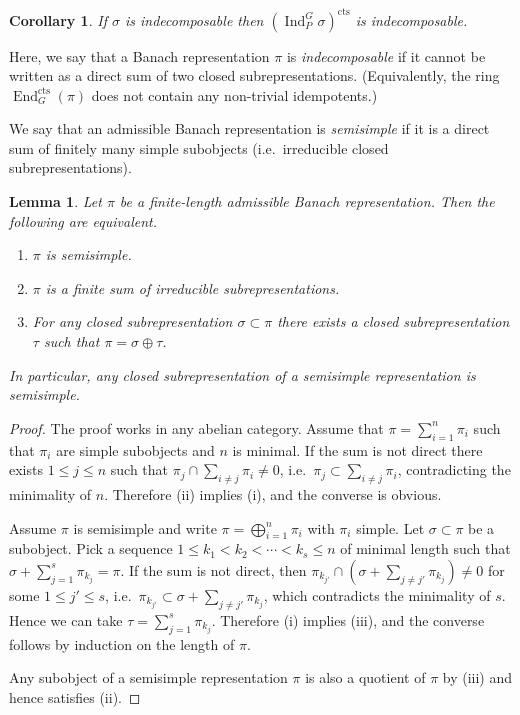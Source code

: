 \documentclass[a4paper]{amsart}
\numberwithin{equation}{section}
\newtheorem{lem}[thm]{Lemma}
\newtheorem{cor}[thm]{Corollary}
\theoremstyle{remark}
\theoremstyle{definition}
\DeclareMathOperator{\Ind}{Ind}
\DeclareMathOperator{\End}{End}
\newcommand{\cts}{\mathrm{cts}}
\begin{document}
\begin{cor}\label{cor:indecomposable}
If $\sigma$ is indecomposable then $(\Ind_{P}^{G}\sigma)^{\cts}$ is indecomposable.
\end{cor}

Here, we say that a Banach representation $\pi$ is \emph{indecomposable} if it cannot be written as a direct sum of two closed subrepresentations.
(Equivalently, the ring $\End_G^\cts(\pi)$ does not contain any non-trivial idempotents.)

We say that an admissible Banach representation is \emph{semisimple} if it is a direct sum of finitely many simple subobjects (i.e.\ irreducible closed subrepresentations).


\begin{lem}\label{lem:semisimple-banach}
Let $\pi$ be a finite-length admissible Banach representation.
Then the following are equivalent.
\begin{enumerate}
\item $\pi$ is semisimple.
\item $\pi$ is a finite sum of irreducible subrepresentations.
\item For any closed subrepresentation $\sigma\subset\pi$ there exists a closed subrepresentation $\tau$ such that $\pi = \sigma\oplus\tau$.
\end{enumerate}
In particular, any closed subrepresentation of a semisimple representation is semisimple.
\end{lem}

\begin{proof}
The proof works in any abelian category.
Assume that $\pi = \sum_{i = 1}^{n}\pi_{i}$ such that $\pi_{i}$ are simple subobjects and $n$ is minimal.
If the sum is not direct there exists $1 \le j \le n$ such that $\pi_j \cap \sum_{i \ne j} \pi_i \ne 0$, i.e.\ $\pi_j \subset \sum_{i \ne j} \pi_i$, contradicting the minimality of $n$.
Therefore (ii) implies (i), and the converse is obvious.

Assume $\pi$ is semisimple and write $\pi = \bigoplus_{i=1}^n \pi_i$ with $\pi_i$ simple.
Let $\sigma\subset\pi$ be a subobject.
Pick a sequence $1 \le k_1 < k_2 < \cdots < k_s \le n$ of minimal length such that $\sigma + \sum_{j=1}^s \pi_{k_j} = \pi$.
If the sum is not direct, then $\pi_{k_{j'}} \cap (\sigma + \sum_{j \ne j'} \pi_{k_j}) \ne 0$ for some $1 \le j' \le s$, i.e.\ $\pi_{k_{j'}} \subset \sigma + \sum_{j \ne j'} \pi_{k_j}$, which contradicts the minimality of $s$.
Hence we can take $\tau = \sum_{j=1}^s \pi_{k_j}$.
Therefore (i) implies (iii), and the converse follows by induction on the length of $\pi$.

Any subobject of a semisimple representation $\pi$ is also a quotient of $\pi$ by (iii) and hence satisfies (ii).
\end{proof}
\end{document}
